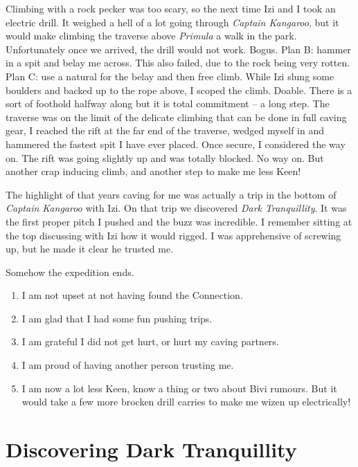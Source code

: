 Climbing with a rock pecker was too scary, so the next time Izi and I
took an electric drill. It weighed a hell of a lot going through
\emph{Captain Kangaroo}, but it would make climbing the traverse above
\emph{Primula} a walk in the park. Unfortunately once we arrived, the
drill would not work. Bogus. Plan B: hammer in a spit and belay me
across. This also failed, due to the rock being very rotten. Plan C: use
a natural for the belay and then free climb. While Izi slung some
boulders and backed up to the rope above, I scoped the climb. Doable.
There is a sort of foothold halfway along but it is total commitment --
a long step. The traverse was on the limit of the delicate climbing that
can be done in full caving gear, I reached the rift at the far end of
the traverse, wedged myself in and hammered the fastest spit I have ever
placed. Once secure, I considered the way on. The rift was going
slightly up and was totally blocked. No way on. But another crap
inducing climb, and another step to make me less Keen!

The highlight of that years caving for me was actually a trip in the
bottom of \emph{Captain Kangaroo} with Izi. On that trip we discovered
\emph{Dark Tranquillity}. It was the first proper pitch I pushed and the
buzz was incredible. I remember sitting at the top discussing with Izi
how it would rigged. I was apprehensive of screwing up, but he made it
clear he trusted me.

Somehow the expedition ends.

\begin{enumerate}
\def\labelenumi{\arabic{enumi}.}
\tightlist
\item
  I am not upset at not having found the Connection.
\item
  I am glad that I had some fun pushing trips.
\item
  I am grateful I did not get hurt, or hurt my caving partners.
\item
  I am proud of having another person trusting me.
\item
  I am now a lot less Keen, know a thing or two about Bivi rumours. But
  it would take a few more brocken drill carries to make me wizen up
  electrically!
\end{enumerate}


\hypertarget{discovering-dark-tranquillity}{%
\section{Discovering Dark
Tranquillity}\label{discovering-dark-tranquillity}}

